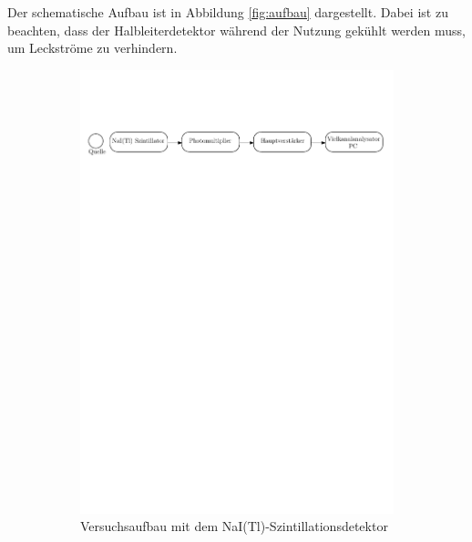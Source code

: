 \documentclass[11pt, a4paper]{article}
\numberwithin{equation}{section}
\begin{document}
Der schematische Aufbau ist in Abbildung \ref{fig:aufbau} dargestellt.
Dabei ist zu beachten, dass der Halbleiterdetektor während der Nutzung gekühlt werden muss, um Leckströme zu verhindern.
\begin{figure}[ht]
	\centering
	\begin{subfigure}{\textwidth}
		\includegraphics[width=\textwidth]{./figures/aufbau_szinti.pdf}
		\caption{Versuchsaufbau mit dem NaI(Tl)-Szintillationsdetektor}	
	\end{subfigure}
	\begin{subfigure}{\textwidth}
		\vspace{20pt}

\end{subfigure}
\end{figure}
\end{document}
